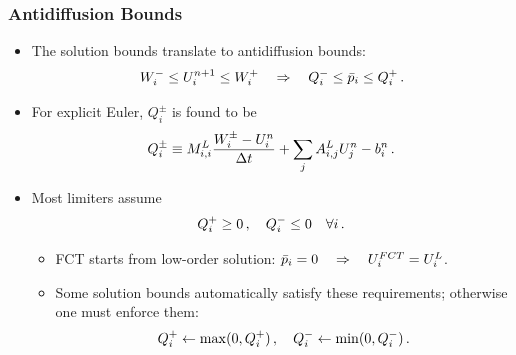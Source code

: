 \begin{frame}
\frametitle{Antidiffusion Bounds}

\begin{itemize}
   \item The solution bounds translate to antidiffusion bounds:
      \begin{equation}
         W_i^-\leq
         U_i^{n+1}\leq
         W_i^+
         \quad \Rightarrow \quad
         Q^-_i \leq \bar{p}_i \leq Q^+_i \,.
      \end{equation}
   \item For explicit Euler, $Q_i^\pm$ is found to be
      \begin{equation}
         Q_i^\pm \equiv M_{i,i}^L\frac{W_i^\pm-U_i^n}{\Delta t}
         + \sum\limits_j A_{i,j}^L U_j^n - b_i^n \,.
      \end{equation}
  \item Most limiters assume
    \begin{equation}
      Q_i^+ \geq 0  \,, \quad Q_i^- \leq 0 \quad \forall i \,.
    \end{equation}
    \begin{itemize}
      \item FCT starts from low-order solution:
        $\bar{p}_i = 0 \quad \Rightarrow \quad
          U^{FCT}_i = U^L_i$.
      \item Some solution bounds automatically satisfy these requirements;
        otherwise one must enforce them:
        \begin{equation}
          Q_i^+ \gets \max(0,Q_i^+) \,, \quad Q_i^- \gets \min(0,Q_i^-) \,.
        \end{equation}
    \end{itemize}
\end{itemize}

\end{frame}
